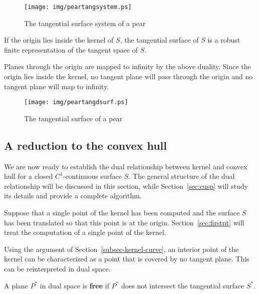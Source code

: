 \documentclass[doublespacing]{elsart}
\begin{document}
\begin{figure}[h]
\begin{center}
\texttt{[image: img/peartangsystem.ps]}
\end{center}
\caption{The tangential surface system of a pear}
\label{fig:peartangsystem}
\end{figure}

\begin{lemma}
\label{lem:drobust}
If the origin lies inside the kernel of $S$,
the tangential surface of $S$ is a robust finite representation of the tangent space of $S$.
\end{lemma}
\prf
Planes through the origin are mapped to infinity by the above duality.
Since the origin lies inside the kernel,
no tangent plane will pass through the origin and no tangent plane will map to infinity.
\QED

\begin{figure}
\begin{center}
\texttt{[image: img/peartangdsurf.ps]}
\end{center}
\caption{The tangential surface of a pear}
\label{fig:peartangdsurf}
\end{figure}


\subsection{A reduction to the convex hull}
\label{sec:reduction}

We are now ready to establish the dual relationship between kernel and convex hull
for a closed $C^1$-continuous surface $S$.
The general structure of the dual relationship will be discussed in this section,
while Section~\ref{sec:cusp} will study its details and provide a complete algorithm.

Suppose that a single point of the kernel has been computed and the surface $S$
has been translated so that this point is at the origin.
Section~\ref{sec:firstpt} will treat the computation of a single point of the kernel.

Using the argument of Section~\ref{subsec-kernel-curve},
an interior point of the kernel can be characterized as a point that is covered by
no tangent plane.
This can be reinterpreted in dual space.

\begin{defn2}
A plane $P^*$ in dual space is {\bf free} if $P^*$ does not intersect the tangential surface $S^*$.
\end{defn2}
\end{document}
